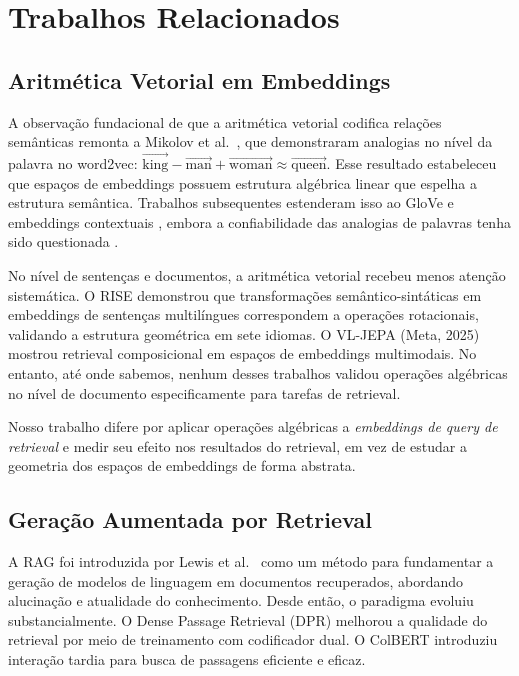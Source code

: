 \documentclass{article}
\begin{document}
\section{Trabalhos Relacionados}

\subsection{Aritmética Vetorial em Embeddings}

A observação fundacional de que a aritmética vetorial codifica relações semânticas remonta a Mikolov et al.\ \cite{mikolov2013}, que demonstraram analogias no nível da palavra no word2vec: $\vec{\text{king}} - \vec{\text{man}} + \vec{\text{woman}} \approx \vec{\text{queen}}$. Esse resultado estabeleceu que espaços de embeddings possuem estrutura algébrica linear que espelha a estrutura semântica. Trabalhos subsequentes estenderam isso ao GloVe \cite{pennington2014} e embeddings contextuais \cite{peters2018}, embora a confiabilidade das analogias de palavras tenha sido questionada \cite{rogers2017}.

No nível de sentenças e documentos, a aritmética vetorial recebeu menos atenção sistemática. O RISE \cite{rise2025} demonstrou que transformações semântico-sintáticas em embeddings de sentenças multilíngues correspondem a operações rotacionais, validando a estrutura geométrica em sete idiomas. O VL-JEPA (Meta, 2025) mostrou retrieval composicional em espaços de embeddings multimodais. No entanto, até onde sabemos, nenhum desses trabalhos validou operações algébricas no nível de documento especificamente para tarefas de retrieval.

Nosso trabalho difere por aplicar operações algébricas a \emph{embeddings de query de retrieval} e medir seu efeito nos resultados do retrieval, em vez de estudar a geometria dos espaços de embeddings de forma abstrata.

\subsection{Geração Aumentada por Retrieval}

A RAG foi introduzida por Lewis et al.\ \cite{lewis2020} como um método para fundamentar a geração de modelos de linguagem em documentos recuperados, abordando alucinação e atualidade do conhecimento. Desde então, o paradigma evoluiu substancialmente. O Dense Passage Retrieval (DPR) \cite{karpukhin2020} melhorou a qualidade do retrieval por meio de treinamento com codificador dual. O ColBERT \cite{khattab2020} introduziu interação tardia para busca de passagens eficiente e eficaz.
\end{document}
